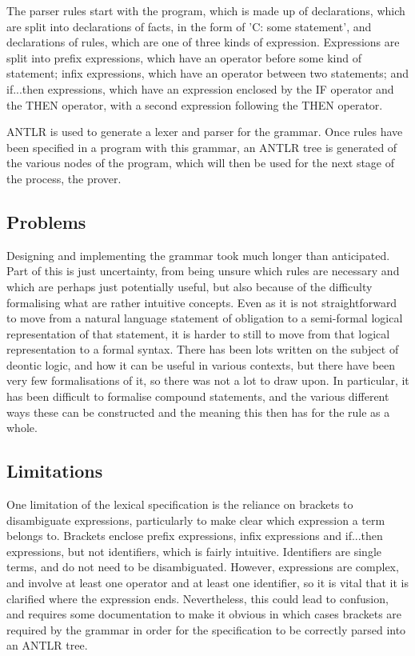 \documentclass{l4proj}
\begin{document}
The parser rules start with the program, which is made up of declarations, which are split into declarations of facts, in the form of 'C: some statement', and declarations of rules, which are one of three kinds of expression. Expressions are split into prefix expressions, which have an operator before some kind of statement; infix expressions, which have an operator between two statements; and if...then expressions, which have an expression enclosed by the IF operator and the THEN operator, with a second expression following the THEN operator. 

ANTLR is used to generate a lexer and parser for the grammar. Once rules have been specified in a program with this grammar, an ANTLR tree is generated of the various nodes of the program, which will then be used for the next stage of the process, the prover. 


\subsection{Problems}
Designing and implementing the grammar took much longer than anticipated. Part of this is just uncertainty, from being unsure which rules are necessary and which are perhaps just potentially useful, but also because of the difficulty formalising what are rather intuitive concepts. Even as it is not straightforward to move from a natural language statement of obligation to a semi-formal logical representation of that statement, it is harder to still to move from that logical representation to a formal syntax. There has been lots written on the subject of deontic logic, and how it can be useful in various contexts, but there have been very few formalisations of it, so there was not a lot to draw upon. In particular, it has been difficult to formalise compound statements, and the various different ways these can be constructed and the meaning this then has for the rule as a whole.

\subsection{Limitations}
One limitation of the lexical specification is the reliance on brackets to disambiguate expressions, particularly to make clear which expression a term belongs to. Brackets enclose prefix expressions, infix expressions and if...then expressions, but not identifiers, which is fairly intuitive. Identifiers are single terms, and do not need to be disambiguated. However, expressions are complex, and involve at least one operator and at least one identifier, so it is vital that it is clarified where the expression ends. Nevertheless, this could lead to confusion, and requires some documentation to make it obvious in which cases brackets are required by the grammar in order for the specification to be correctly parsed into an ANTLR tree. 
\end{document}
